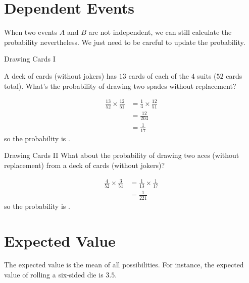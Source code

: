 \documentclass[a4paper,10pt]{report}
\begin{document}
\section{Dependent Events}

When two events $A$ and $B$ are not independent, we can still calculate the
probability nevertheless. We just need to be careful to update the probability.

\begin{problem}{Drawing Cards I}

 A deck of cards (without jokers) has $13$ cards of each of the $4$ suits ($52$
 cards total). What's the probability of drawing two spades without replacement?

 \begin{solution}
  \begin{align*}
   \frac{13}{52} \times \frac{12}{51}
   &= \frac{1}{4} \times \frac{12}{51} \\
   &= \frac{12}{204} \\
   &= \frac{1}{17}
  \end{align*}
  so the probability is .
 \end{solution}

\end{problem}

\begin{problem}{Drawing Cards II}
 What about the probability of drawing two aces (without replacement) from a
 deck of cards (without jokers)?

 \begin{solution}
  \begin{align*}
   \frac{4}{52} \times \frac{3}{51}
   &= \frac{1}{13} \times \frac{1}{17} \\
   &= \frac{1}{221}
  \end{align*}
  so the probability is .
 \end{solution}
\end{problem}

\section{Expected Value}

The expected value is the mean of all possibilities. For instance, the expected
value of rolling a six-sided die is $3.5$.


\printglossaries

\cleardoublepage
{}
\listoffigures
\end{document}
